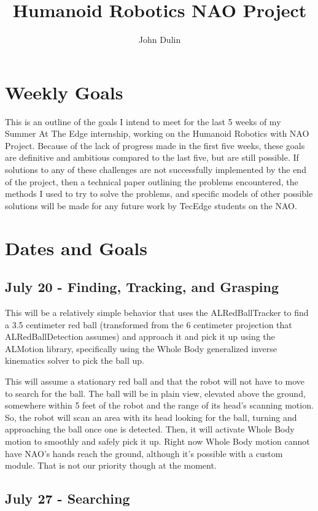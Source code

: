 \documentclass[12pt]{report}
\begin{document}
\title{Humanoid Robotics NAO Project}
\author{John Dulin}

\chapter{Weekly Goals}

\indent
This is an outline of the goals I intend to meet for the last 5 weeks of my Summer At The Edge internship, working on the
Humanoid Robotics with NAO Project.  Because of the lack of progress made in the first five weeks, these goals are definitive and
ambitious compared to the last five, but are still possible.  If solutions to any of these challenges are not successfully implemented 
by the end of the project, then a technical paper outlining the problems encountered, the methods I used to try to solve the problems, 
and specific models of other possible solutions will be made for any future work by TecEdge students on the NAO.

\chapter{Dates and Goals}

\section{July 20 - Finding, Tracking, and Grasping}

\indent
This will be a relatively simple behavior that uses the ALRedBallTracker to find a 3.5 centimeter red ball
(transformed from the 6 centimeter projection that ALRedBallDetection assumes) and approach it and pick it up using
the ALMotion library, specifically using the Whole Body generalized inverse kinematics solver to pick the ball up.

This will assume a stationary red ball and that the robot will not have to move to search for the ball.
The ball will be in plain view, elevated above the ground, somewhere within 5 feet of the robot and the range of its head's scanning motion. 
 So, the robot will scan an area with its head looking for the ball, turning and approaching the ball once one is detected. Then, it will activate
Whole Body motion to smoothly and safely pick it up.  Right now Whole Body motion cannot have NAO's hands reach the ground, although it's possible
with a custom module.  That is not our priority though at the moment.


\section{July 27 - Searching}
\end{document}
